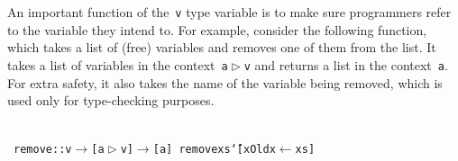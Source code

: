 \documentclass[9pt,authoryear]{sigplanconf}
\begin{document}
%
An important function of the{~}\texttt{v} type variable is to make sure
    programmers refer to the variable they intend to. For example,
    consider the following function, which takes a list of (free)
    variables and removes one of them from the list. It takes a list
    of variables in the context{~}\texttt{a}\texttt{\mbox{\hspace{0.50em}}}\texttt{$ \vartriangleright $}\texttt{\mbox{\hspace{0.50em}}}\texttt{v} and returns a list in the
    context{~}\texttt{a}. For extra safety, it also takes the name of the
    variable being removed, which is used only for type-checking
    purposes.%


{\nopagebreak }

%
%
%
~\\~\vphantom{$\{$}\texttt{remove}\texttt{\mbox{\hspace{0.50em}}}\texttt{{:}{:}}\texttt{\mbox{\hspace{0.50em}}}\texttt{v}\texttt{\mbox{\hspace{0.50em}}}\texttt{$ \rightarrow $}\texttt{\mbox{\hspace{0.50em}}}\texttt{{[}}\texttt{a}\texttt{\mbox{\hspace{0.50em}}}\texttt{$ \vartriangleright $}\texttt{\mbox{\hspace{0.50em}}}\texttt{v}\texttt{{]}}\texttt{\mbox{\hspace{0.50em}}}\texttt{$ \rightarrow $}\texttt{\mbox{\hspace{0.50em}}}\texttt{{[}}\texttt{a}\texttt{{]}}\texttt{{\nopagebreak \newline%
}\vphantom{$\{$}}\texttt{remove}\texttt{\mbox{\hspace{0.50em}}}\texttt{\makebox[1.22ex][c]{\_{}}}\texttt{\mbox{\hspace{0.50em}}}\texttt{xs}\texttt{\mbox{\hspace{0.50em}}}\texttt{{\char `\=}}\texttt{\mbox{\hspace{0.50em}}}\texttt{{[}}\texttt{x}\texttt{\mbox{\hspace{0.50em}}}\texttt{\makebox[1.22ex][c]{\textbar{}}}\texttt{\mbox{\hspace{0.50em}}}\texttt{Old}\texttt{\mbox{\hspace{0.50em}}}\texttt{x}\texttt{\mbox{\hspace{0.50em}}}\texttt{$ \leftarrow $}\texttt{\mbox{\hspace{0.50em}}}\texttt{xs}\texttt{{]}}\texttt{{\nopagebreak \newline%
}\vphantom{$\{$}}%
\end{document}
